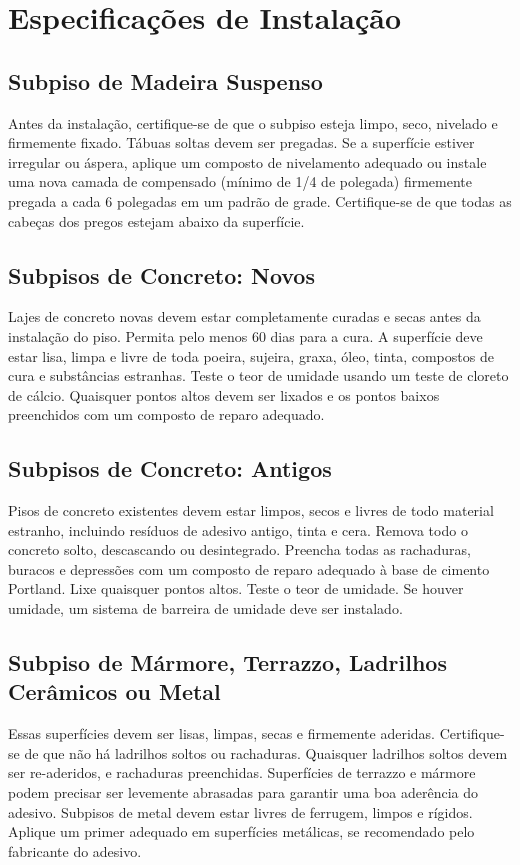 \documentclass[a4paper]{article}
\begin{document}
\vspace{1em} %

\section*{Especificações de Instalação}

\subsection*{Subpiso de Madeira Suspenso}
Antes da instalação, certifique-se de que o subpiso esteja limpo, seco, nivelado e firmemente fixado. Tábuas soltas devem ser pregadas. Se a superfície estiver irregular ou áspera, aplique um composto de nivelamento adequado ou instale uma nova camada de compensado (mínimo de 1/4 de polegada) firmemente pregada a cada 6 polegadas em um padrão de grade. Certifique-se de que todas as cabeças dos pregos estejam abaixo da superfície.

\subsection*{Subpisos de Concreto: Novos}
Lajes de concreto novas devem estar completamente curadas e secas antes da instalação do piso. Permita pelo menos 60 dias para a cura. A superfície deve estar lisa, limpa e livre de toda poeira, sujeira, graxa, óleo, tinta, compostos de cura e substâncias estranhas. Teste o teor de umidade usando um teste de cloreto de cálcio. Quaisquer pontos altos devem ser lixados e os pontos baixos preenchidos com um composto de reparo adequado.

\subsection*{Subpisos de Concreto: Antigos}
Pisos de concreto existentes devem estar limpos, secos e livres de todo material estranho, incluindo resíduos de adesivo antigo, tinta e cera. Remova todo o concreto solto, descascando ou desintegrado. Preencha todas as rachaduras, buracos e depressões com um composto de reparo adequado à base de cimento Portland. Lixe quaisquer pontos altos. Teste o teor de umidade. Se houver umidade, um sistema de barreira de umidade deve ser instalado.

\subsection*{Subpiso de Mármore, Terrazzo, Ladrilhos Cerâmicos ou Metal}
Essas superfícies devem ser lisas, limpas, secas e firmemente aderidas. Certifique-se de que não há ladrilhos soltos ou rachaduras. Quaisquer ladrilhos soltos devem ser re-aderidos, e rachaduras preenchidas. Superfícies de terrazzo e mármore podem precisar ser levemente abrasadas para garantir uma boa aderência do adesivo. Subpisos de metal devem estar livres de ferrugem, limpos e rígidos. Aplique um primer adequado em superfícies metálicas, se recomendado pelo fabricante do adesivo.
\end{document}
